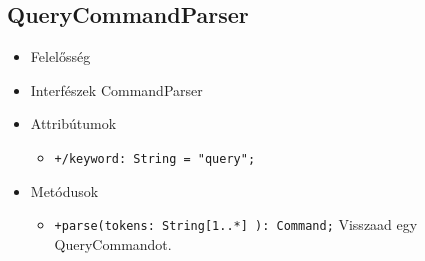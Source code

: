 \subsection{QueryCommandParser}
\begin{itemize}
\item Felelősség\newline
\item Interfészek\newline
CommandParser
\item Attribútumok
	\begin{itemize}
		\item \texttt{+/keyword: String = "query";}
	\end{itemize}
\item Metódusok
\begin{itemize}
		\item \texttt{+parse(tokens: String[1..*] ): Command;} \newline
		Visszaad egy QueryCommandot.
	\end{itemize}
\end{itemize}


